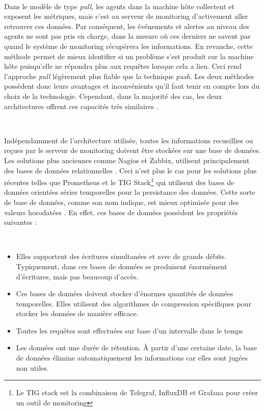 ~

\noindent
Dans le modèle de type \textit{pull}, les agents dans la machine hôte collectent et exposent les métriques, mais c'est au serveur de monitoring d'activement aller retrouver ces données. Par conséquent, les événements et alertes au niveau des agents ne sont pas pris en charge, dans la mesure où ces derniers ne savent pas quand le système de monitoring récupérera les informations. En revanche, cette méthode permet de mieux identifier si un problème s'est produit sur la machine hôte puisqu'elle ne répondra plus aux requêtes lorsque cela a lieu.\cite{prometheus_doc_pull_push} Ceci rend l'approche \textit{pull} légèrement plus fiable que la technique \textit{push}. Les deux méthodes possèdent donc leurs avantages et inconvénients qu'il faut tenir en compte lors du choix de la technologie. Cependant, dans la majorité des cas, les deux architectures offrent ces capacités très similaires \cite{interview_push_pull}.

~

\noindent
Indépendamment de l'architecture utilisée, toutes les informations recueillies ou reçues par le serveur de monitoring doivent être stockées sur une base de données. Les solutions plus anciennes comme Nagios et Zabbix, utilisent principalement des bases de données relationnelles \cite{nagios_db, zabbix_db}. Ceci n'est plus le cas pour les solutions plus récentes telles que Prometheus et le TIG Stack\footnote{Le TIG stack est la combinaison de Telegraf, InfluxDB et Grafana pour créer un outil de monitoring} qui utilisent des bases de données orientées séries temporelles pour la persistance des données. Cette sorte de base de données, comme son nom indique, est mieux optimisée pour des valeurs horodatées \cite{time_series_fr}. En effet, ces bases de données possèdent les propriétés suivantes \cite{alibaba_timeseries}:

~

\begin{itemize}
  \item Elles supportent des écritures simultanées et avec de grands débits. Typiquement, dans ces bases de données se produisent énormément d'écritures, mais pas beaucoup d'accès.
  \item Ces bases de données doivent stocker d'énormes quantités de données temporelles. Elles utilisent des algorithmes de compression spécifiques pour stocker les données de manière efficace. \cite{di2007efficient}
  \item Toutes les requêtes sont effectuées sur base d'un intervalle dans le temps
  \item Les données ont une durée de rétention. À partir d'une certaine date, la base de données élimine automatiquement les informations car elles sont jugées non utiles.
\end{itemize}

